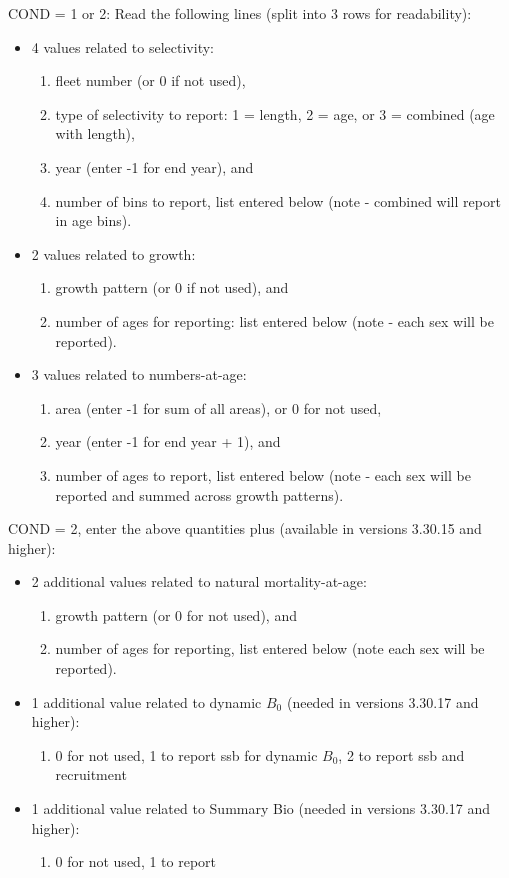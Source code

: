 COND = 1 or 2: Read the following lines (split into 3 rows for readability):
\begin{itemize}
	\item 4 values related to selectivity:
	\begin{enumerate}
		\item fleet number (or 0 if not used),
		\item type of selectivity to report: 1 = length, 2 = age, or 3 = combined (age with length),
		\item year (enter -1 for end year), and
		\item number of bins to report, list entered below (note - combined will report in age bins).
	\end{enumerate}	
	\item 2 values related to growth:
	\begin{enumerate}
		\item growth pattern (or 0 if not used), and
		\item number of ages for reporting: list entered below (note - each sex will be reported).
	\end{enumerate}	
	\item 3 values related to numbers-at-age:
	\begin{enumerate}
		\item area (enter -1 for sum of all areas), or 0 for not used,
		\item year (enter -1 for end year + 1), and
		\item number of ages to report, list entered below (note - each sex will be reported and summed across growth patterns).
	\end{enumerate}
\end{itemize}

COND = 2, enter the above quantities plus (available in versions 3.30.15 and higher):  
\begin{itemize}
	\item 2 additional values related to natural mortality-at-age:
	\begin{enumerate}
		\item growth pattern (or 0 for not used), and
		\item number of ages for reporting, list entered below (note each sex will be reported).
	\end{enumerate}
	\item 1 additional value related to dynamic $B_{0}$ (needed in versions 3.30.17 and higher):
	\begin{enumerate}
		\item 0 for not used, 1 to report \gls{ssb} for dynamic $B_{0}$, 2 to report \gls{ssb} and recruitment
	\end{enumerate}
	\item 1 additional value related to Summary Bio (needed in versions 3.30.17 and higher):
	   \begin{enumerate}
	     \item 0 for not used, 1 to report
	   \end{enumerate}
	   
\end{itemize}

